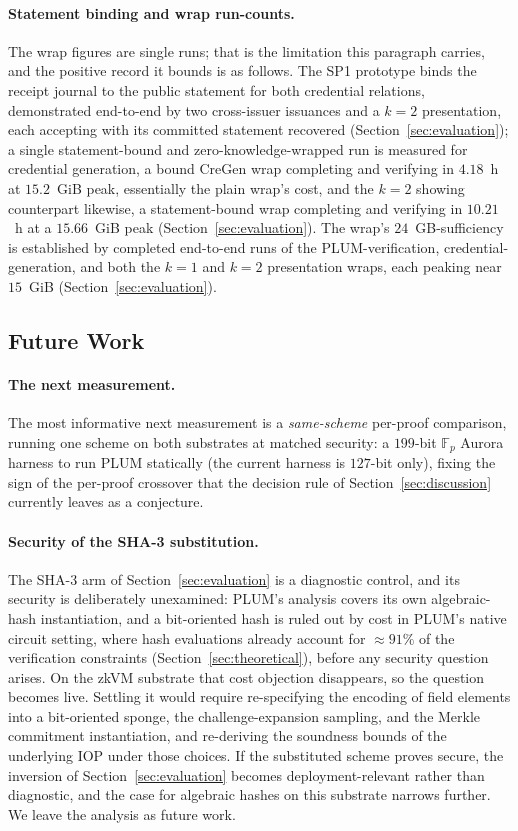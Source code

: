 \paragraph{Statement binding and wrap run-counts.}
The wrap figures are single runs; that is the limitation this paragraph carries, and the positive record it bounds is as follows. The SP1 prototype binds the receipt journal to the public statement for both credential relations, demonstrated end-to-end by two cross-issuer issuances and a $k=2$ presentation, each accepting with its committed statement recovered (Section~\ref{sec:evaluation}); a single statement-bound and zero-knowledge-wrapped run is measured for credential generation, a bound CreGen wrap completing and verifying in $4.18$~h at $15.2$~GiB peak, essentially the plain wrap's cost, and the $k=2$ showing counterpart likewise, a statement-bound wrap completing and verifying in $10.21$~h at a $15.66$~GiB peak (Section~\ref{sec:evaluation}). The wrap's $24$~GB-sufficiency is established by completed end-to-end runs of the PLUM-verification, credential-generation, and both the $k=1$ and $k=2$ presentation wraps, each peaking near $15$~GiB (Section~\ref{sec:evaluation}).
\subsection{Future Work}\label{subsec:conclusion-future}

\paragraph{The next measurement.}
The most informative next measurement is a \emph{same-scheme} per-proof comparison, running one scheme on both substrates at matched security: a $199$-bit $\mathbb{F}_p$ Aurora harness to run PLUM statically (the current harness is $127$-bit only), fixing the sign of the per-proof crossover that the decision rule of Section~\ref{sec:discussion} currently leaves as a conjecture.

\paragraph{Security of the SHA-3 substitution.}
The SHA-3 arm of Section~\ref{sec:evaluation} is a diagnostic control, and its security is deliberately unexamined: PLUM's analysis covers its own algebraic-hash instantiation, and a bit-oriented hash is ruled out by cost in PLUM's native circuit setting, where hash evaluations already account for ${\approx}91\%$ of the verification constraints (Section~\ref{sec:theoretical}), before any security question arises. On the zkVM substrate that cost objection disappears, so the question becomes live. Settling it would require re-specifying the encoding of field elements into a bit-oriented sponge, the challenge-expansion sampling, and the Merkle commitment instantiation, and re-deriving the soundness bounds of the underlying IOP under those choices. If the substituted scheme proves secure, the inversion of Section~\ref{sec:evaluation} becomes deployment-relevant rather than diagnostic, and the case for algebraic hashes on this substrate narrows further. We leave the analysis as future work.

